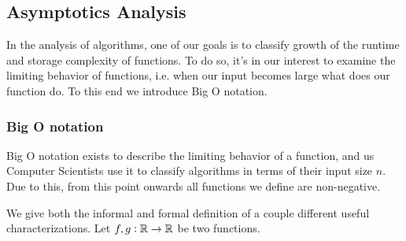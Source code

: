 
\subsection{Asymptotics Analysis}

In the analysis of algorithms, one of our goals is to classify growth of the
runtime and storage complexity of functions. To do so, it's in our interest to
examine the limiting behavior of functions, i.e. when our input becomes large
what does our function do. To this end we introduce Big O notation.

\subsubsection{Big O notation}

Big O notation exists to describe the limiting behavior of a function, and us
Computer Scientists use it to classify algorithms in terms of their input size
$n$. Due to this, from this point onwards all functions we define are
non-negative. 

We give both the informal and formal definition of a couple different
useful characterizations. Let $f,g : \mathbb{R} \to \mathbb{R}$ be two functions.

